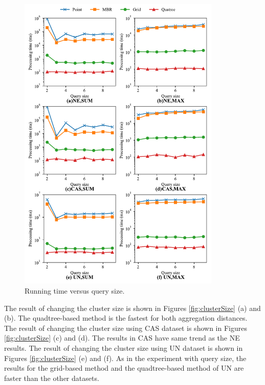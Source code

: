 \documentclass[a4paper,11pt]{report}
\theoremstyle{mytheoremstyle}
\begin{document}
\begin{figure}
    \begin{center}
        \includegraphics[width=0.86\textwidth]{matplotlib/export/querysize.pdf}
    \end{center}
    \caption{Running time versus query size.}
    \label{fig:querySize}
\end{figure}

The result of changing the cluster size is shown in Figures \ref{fig:clusterSize} (a) and (b). The quadtree-based method is the fastest for both aggregation distances.
The result of changing the cluster size using CAS dataset is shown in Figures \ref{fig:clusterSize} (c) and (d). The results in CAS have same trend as the NE results.
The result of changing the cluster size using UN dataset is shown in Figures \ref{fig:clusterSize} (e) and (f). As in the experiment with query size, the results for the grid-based method and the quadtree-based method of UN are faster than the other datasets.
\end{document}
